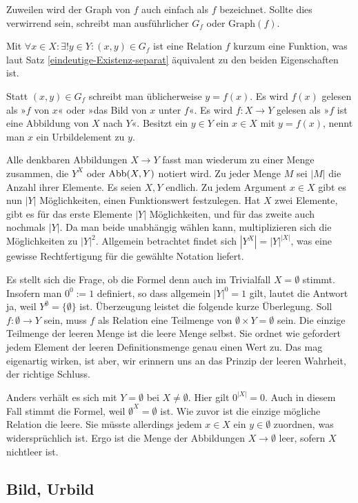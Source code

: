 Zuweilen wird der Graph von $f$ auch einfach als $f$ bezeichnet.
Sollte dies verwirrend sein, schreibt man ausführlicher $G_f$ oder
$\mathrm{Graph}(f)$.

Mit $\forall x\in X\colon\exists!y\in Y\colon (x,y)\in G_f$
ist eine Relation $f$ kurzum eine Funktion, was laut Satz
\ref{eindeutige-Existenz-separat} äquivalent zu den beiden
Eigenschaften ist.

Statt $(x,y)\in G_f$ schreibt man üblicherweise $y=f(x)$. Es
wird $f(x)$ gelesen als »$f$ von $x$« oder »das Bild von $x$ unter
$f$«. Es wird $f\colon X\to Y$ gelesen als »$f$ ist eine Abbildung
von $X$ nach $Y$«. Besitzt ein $y\in Y$ ein $x\in X$ mit $y=f(x)$,
nennt man $x$ ein Urbildelement zu $y$.

Alle denkbaren Abbildungen $X\to Y$ fasst man wiederum zu einer
Menge zusammen, die $Y^X$ oder $\operatorname{Abb}(X,Y)$ notiert wird. Zu jeder
Menge $M$ sei $|M|$ die Anzahl ihrer Elemente. Es seien $X,Y$ endlich.
Zu jedem Argument $x\in X$ gibt es nun $|Y|$ Möglichkeiten, einen
Funktionswert festzulegen. Hat $X$ zwei Elemente, gibt es für das
erste Elemente $|Y|$ Möglichkeiten, und für das zweite auch nochmals
$|Y|$. Da man beide unabhängig wählen kann, multiplizieren sich die
Möglichkeiten zu $|Y|^2$. Allgemein betrachtet findet sich
$|Y^X| = |Y|^{|X|}$, was eine gewisse Rechtfertigung für die gewählte
Notation liefert.

Es stellt sich die Frage, ob die Formel denn auch im Trivialfall
$X=\emptyset$ stimmt. Insofern man $0^0:=1$ definiert, so dass allgemein
$|Y|^0=1$ gilt, lautet die Antwort ja, weil
$Y^\emptyset=\{\emptyset\}$ ist. Überzeugung leistet die folgende
kurze Überlegung. Soll $f\colon\emptyset\to Y$
sein, muss $f$ als Relation eine Teilmenge von $\emptyset\times Y=\emptyset$
sein. Die einzige Teilmenge der leeren Menge ist die leere Menge selbst.
Sie ordnet wie gefordert jedem Element der leeren Definitionsmenge genau
einen Wert zu. Das mag eigenartig wirken, ist aber, wir erinnern uns an
das Prinzip der leeren Wahrheit, der richtige Schluss.

Anders verhält es sich mit $Y=\emptyset$ bei $X\ne\emptyset$.
Hier gilt $0^{|X|}=0$. Auch in diesem Fall stimmt die Formel, weil
$\emptyset^X = \emptyset$ ist. Wie zuvor ist die einzige mögliche Relation
die leere. Sie müsste allerdings jedem $x\in X$ ein $y\in\emptyset$
zuordnen, was widersprüchlich ist. Ergo ist die Menge der Abbildungen
$X\to\emptyset$ leer, sofern $X$ nichtleer ist.

\subsection{Bild, Urbild}

